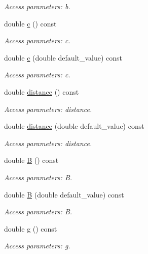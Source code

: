 \begin{DoxyCompactItemize}
\begin{DoxyCompactList}\small\item\em Access parameters\+: b. \end{DoxyCompactList}\item 
double \hyperlink{struct_d_d4hep_1_1_x_m_l_1_1_dimension_aaa3e181c05ec07616bf745173004d73f}{c} () const
\begin{DoxyCompactList}\small\item\em Access parameters\+: c. \end{DoxyCompactList}\item 
double \hyperlink{struct_d_d4hep_1_1_x_m_l_1_1_dimension_a5ff71d66e676f0f3a40113b3b177f3bc}{c} (double default\+\_\+value) const
\begin{DoxyCompactList}\small\item\em Access parameters\+: c. \end{DoxyCompactList}\item 
double \hyperlink{struct_d_d4hep_1_1_x_m_l_1_1_dimension_aac57007c384cef402070204d61365cdd}{distance} () const
\begin{DoxyCompactList}\small\item\em Access parameters\+: distance. \end{DoxyCompactList}\item 
double \hyperlink{struct_d_d4hep_1_1_x_m_l_1_1_dimension_a61efc93a10d69420d0606c36ab6318cb}{distance} (double default\+\_\+value) const
\begin{DoxyCompactList}\small\item\em Access parameters\+: distance. \end{DoxyCompactList}\item 
double \hyperlink{struct_d_d4hep_1_1_x_m_l_1_1_dimension_a712d20cdc9cb1b86f8531e313484dacd}{B} () const
\begin{DoxyCompactList}\small\item\em Access parameters\+: B. \end{DoxyCompactList}\item 
double \hyperlink{struct_d_d4hep_1_1_x_m_l_1_1_dimension_a8bdc27a9e047f44daaf1a753541326ac}{B} (double default\+\_\+value) const
\begin{DoxyCompactList}\small\item\em Access parameters\+: B. \end{DoxyCompactList}\item 
double \hyperlink{struct_d_d4hep_1_1_x_m_l_1_1_dimension_ad4176a456a58f530d2daaf1ed5f7f9dc}{g} () const
\begin{DoxyCompactList}\small\item\em Access parameters\+: g. \end{DoxyCompactList}\item 

\end{DoxyCompactItemize}
